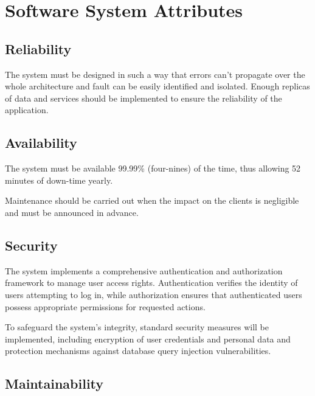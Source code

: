 \section{Software System Attributes}
\label{sec:software-system-attributes}%

\subsection{Reliability}
\label{subsec:reliability}%

\par The system must be designed in such a way that errors can’t propagate over the whole architecture and fault can be
easily identified and isolated. Enough replicas of data and services should be implemented to ensure the reliability of
the application.

\subsection{Availability}
\label{subsec:availability}%

\par The system must be available 99.99\% (four-nines) of the time, thus allowing 52 minutes of down-time yearly.

\par Maintenance should be carried out when the impact on the clients is negligible and must be announced in advance.

\subsection{Security}
\label{subsec:security}%

\par The system implements a comprehensive authentication and authorization framework to manage user access rights.
Authentication verifies the identity of users attempting to log in, while authorization ensures that authenticated
users possess appropriate permissions for requested actions.

\par To safeguard the system's integrity, standard security measures will be implemented, including encryption of user
credentials and personal data and protection mechanisms against database query injection vulnerabilities.

\subsection{Maintainability}
\label{subsec:maintainability}%


